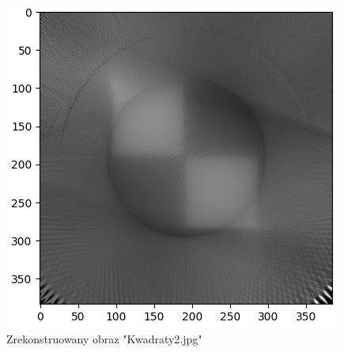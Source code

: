 \documentclass[a4paper,11pt]{article}
\begin{document}
    \begin{figure}[H]
    \centering
    \includegraphics[scale=0.4]{Kwadraty2_reconstructed.png}
    \caption{Zrekonstruowany obraz "Kwadraty2.jpg"}
  \end{figure}
\end{document}
